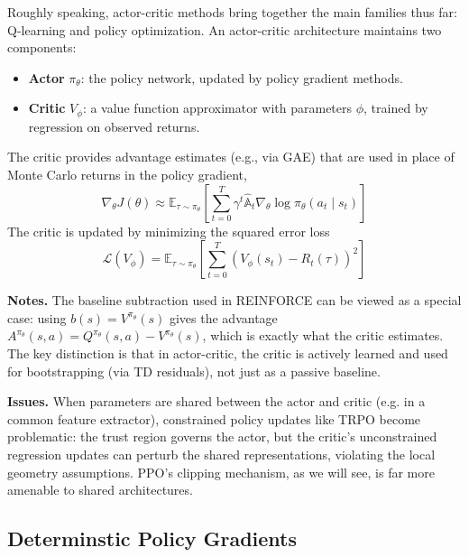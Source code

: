 \documentclass[11pt, letterpaper]{article}
\begin{document}
\begin{concept}
    Roughly speaking, actor-critic methods bring together the main families thus far: Q-learning and policy optimization. An actor-critic architecture maintains two components: 
    \begin{itemize}
        \item \textbf{Actor} \(\pi_\theta\): the policy network, updated by policy gradient methods. 
        \item \textbf{Critic} \(V_\phi\): a value function approximator with parameters \(\phi\), trained by regression on observed returns. 
    \end{itemize}
    The critic provides advantage estimates (e.g., via GAE) that are used in place of Monte Carlo returns in the policy gradient, 
    \[
        \nabla_\theta J(\theta) \approx \mathbb{E}_{\tau \sim \pi_\theta} \left[ \sum_{t=0}^T \gamma^t \widehat{\mathbb{A}}_t \nabla_\theta \log \pi_\theta(a_t \mid s_t) \right]
    \]
    The critic is updated by minimizing the squared error loss 
    \[
        \mathcal{L}(V_\phi) = \mathbb{E}_{\tau \sim \pi_\theta}\left[\sum_{t=0}^T (V_\phi(s_t) - R_t(\tau))^2\right]
    \]
\end{concept}

\begin{remark}
    \textbf{Notes.} The baseline subtraction used in REINFORCE can be viewed as a special case: using \(b(s) = V^{\pi_\theta}(s)\) gives the advantage \(A^{\pi_\theta}(s,a) = Q^{\pi_\theta}(s,a) - V^{\pi_\theta}(s)\), which is exactly what the critic estimates. The key distinction is that in actor-critic, the critic is actively learned and used for bootstrapping (via TD residuals), not just as a passive baseline. 
    
    \textbf{Issues.} When parameters are shared between the actor and critic (e.g. in a common feature extractor), constrained policy updates like TRPO become problematic: the trust region governs the actor, but the critic's unconstrained regression updates can perturb the shared representations, violating the local geometry assumptions. PPO's clipping mechanism, as we will see, is far more amenable to shared architectures. 
\end{remark}

\subsection{Determinstic Policy Gradients} 
\end{document}
